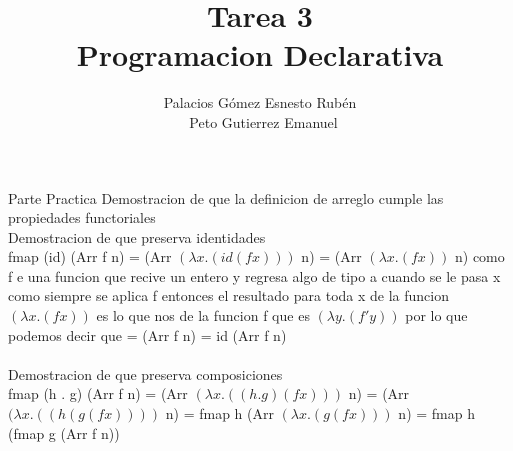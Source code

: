 \documentclass{article}
\title{Tarea 3 \\ Programacion Declarativa}
\author{Palacios Gómez Esnesto Rubén \\ \ Peto Gutierrez Emanuel}
\begin{document}
	\maketitle
	\begin{flushleft}

	Parte Practica Demostracion de que la definicion de arreglo cumple las propiedades functoriales \\ 
	Demostracion de que preserva identidades \\ 
	fmap (id) (Arr f n) =  (Arr $ (\lambda x .(id (f x)))$  n)  = (Arr $(\lambda x . (f x))$ n) 
	como f e una funcion que recive un entero y regresa algo de tipo a cuando se le pasa x como siempre se aplica f entonces el resultado para toda x de la funcion $(\lambda x . (f x))$
	es lo que nos de la funcion f que es $(\lambda y . (f' y))$ por lo que podemos decir que 
    = (Arr f n) =  id (Arr f n) \\ \ \\
    Demostracion de que preserva composiciones \\ 
    fmap (h . g) (Arr f n) = (Arr $ (\lambda x .((h.g)(f x)))$  n) = (Arr $ (\lambda x .((h (g (f x))))$  n) = fmap h (Arr $ (\lambda x .(g(f x)))$  n) = fmap h (fmap g (Arr f n))
	\end{flushleft}
\end{document}
